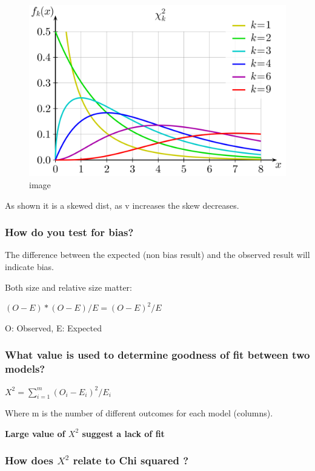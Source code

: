 \documentclass[
]{article}
\begin{document}
\begin{figure}
\centering
\includegraphics{Chi-square_pdf.png}
\caption{image}
\end{figure}

As shown it is a skewed dist, as v increases the skew decreases.

\hypertarget{how-do-you-test-for-bias}{%
\subsubsection{How do you test for
bias?}\label{how-do-you-test-for-bias}}

The difference between the expected (non bias result) and the observed
result will indicate bias.

Both size and relative size matter:

\((O-E) * (O-E)/E = (O-E)^2/E\)

O: Observed, E: Expected

\hypertarget{what-value-is-used-to-determine-goodness-of-fit-between-two-models}{%
\subsubsection{What value is used to determine goodness of fit between
two
models?}\label{what-value-is-used-to-determine-goodness-of-fit-between-two-models}}

\(X^2 = \sum^{m}_{i=1} (O_i - E_i)^2/E_i\)

Where m is the number of different outcomes for each model (columns).

\textbf{Large value of \(X^2\) suggest a lack of fit}

\hypertarget{how-does-x2-relate-to-chi-squared}{%
\subsubsection{\texorpdfstring{How does \(X^2\) relate to Chi squared
?}{How does X\^{}2 relate to Chi squared ?}}\label{how-does-x2-relate-to-chi-squared}}
\end{document}
